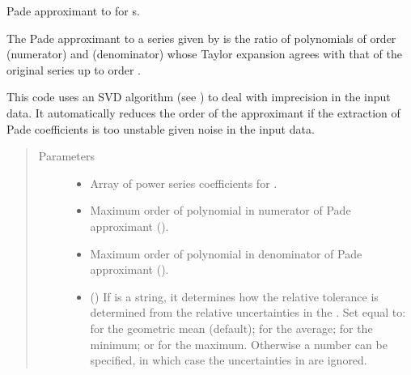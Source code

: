 \documentclass[letterpaper,10pt,english]{sphinxmanual}
\begin{document}

\begin{fulllineitems}
\label{\detokenize{g2tools:g2tools.pade_gvar}}
\sphinxcode{\sphinxupquote{{[}m,n{]}}} Pade approximant to  for s.

The \sphinxcode{\sphinxupquote{{[}m,n{]}}} Pade approximant to a series given by
 is the ratio of  polynomials of order 
(numerator) and  (denominator) whose  Taylor expansion agrees
with that of the original series up to order .

This code uses an SVD algorithm (see {\hyperref[\detokenize{g2tools:g2tools.pade_svd}]{}}) to deal with
imprecision in the input data. It automatically reduces
the order of the approximant if the extraction of Pade coefficients
is too unstable given noise in the input data.
\begin{quote}\begin{description}
\item[{Parameters}] \leavevmode\begin{itemize}
\item {} 
 \textendash{} Array  of power series coefficients for .

\item {} 
 \textendash{} Maximum order of polynomial in numerator of Pade
approximant ().

\item {} 
 \textendash{} Maximum order of polynomial in denominator of Pade
approximant ().

\item {} 
 () \textendash{} If  is a string, it determines how the
relative tolerance is determined from the relative
uncertainties in the . Set  equal to:
 for the geometric mean (default);  for
the average;  for the minimum; or  for
the maximum. Otherwise a number can be specified, in which case
the uncertainties in  are ignored.


\end{itemize}
\end{description}
\end{quote}
\end{fulllineitems}
\end{document}
